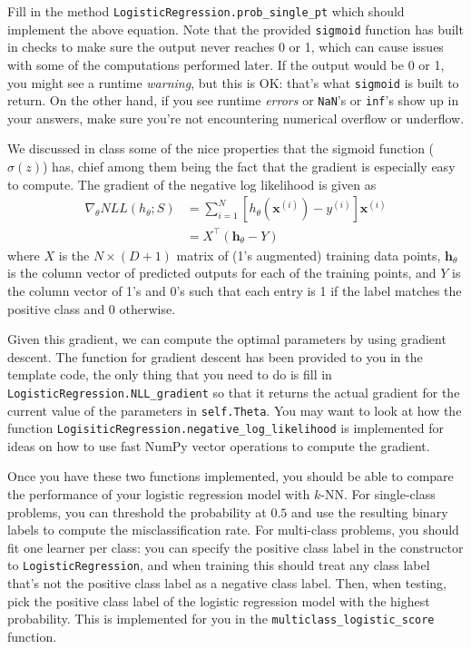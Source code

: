 \documentclass{article}
\begin{document}
Fill in the method \texttt{LogisticRegression.prob\_single\_pt} which should implement the above equation. Note that the provided \texttt{sigmoid} function has built in checks to make sure the output never reaches 0 or 1, which can cause issues with some of the computations performed later. If the output would be 0 or 1, you might see a runtime \emph{warning}, but this is OK: that's what \texttt{sigmoid} is built to return. On the other hand, if you see runtime \emph{errors} or \texttt{NaN}'s or \texttt{inf}'s show up in your answers, make sure you're not encountering numerical overflow or underflow. 

We discussed in class some of the nice properties that the sigmoid function (\(\sigma(z)\)) has, chief among them being the fact that the gradient is especially easy to compute. The gradient of the negative log likelihood is given as
\begin{align}
	\nabla_\theta NLL(h_\theta;S) &= \sum_{i=1}^N \left[ h_\theta(\mathbf{x}^{(i)})-y^{(i)} \right] \mathbf{x}^{(i)}\\
	&= X^\top(\mathbf{h}_\theta - Y)
\end{align}
where \(X\) is the \(N\times(D+1)\) matrix of (1's augmented) training data points, \(\mathbf{h}_\theta\) is the column vector of predicted outputs for each of the training points, and \(Y\) is the column vector of 1's and 0's such that each entry is 1 if the label matches the positive class and 0 otherwise.

Given this gradient, we can compute the optimal parameters by using gradient descent. The function for gradient descent has been provided to you in the template code, the only thing that you need to do is fill in \texttt{LogisticRegression.NLL\_gradient} so that it returns the actual gradient for the current value of the parameters in \texttt{self.Theta}. You may want to look at how the function \texttt{LogisiticRegression.negative\_log\_likelihood} is implemented for ideas on how to use fast NumPy vector operations to compute the gradient.

Once you have these two functions implemented, you should be able to compare the performance of your logistic regression model with \(k\)-NN. For single-class problems, you can threshold the probability at \(0.5\) and use the resulting binary labels to compute the misclassification rate. For multi-class problems, you should fit one learner per class: you can specify the positive class label in the constructor to \texttt{LogisticRegression}, and when training this should treat any class label that's not the positive class label as a negative class label. Then, when testing, pick the positive class label of the logistic regression model with the highest probability. This is implemented for you in the \texttt{multiclass\_logistic\_score} function.
\end{document}
